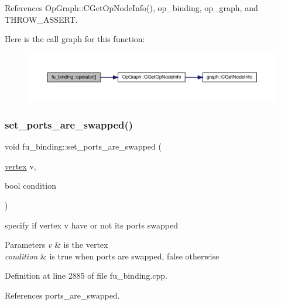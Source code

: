 References Op\+Graph\+::\+C\+Get\+Op\+Node\+Info(), op\+\_\+binding, op\+\_\+graph, and T\+H\+R\+O\+W\+\_\+\+A\+S\+S\+E\+RT.

Here is the call graph for this function\+:
\nopagebreak
\begin{figure}[H]
\begin{center}
\leavevmode
\includegraphics[width=350pt]{d8/d04/classfu__binding_a51f3555cae82ec4eabe7c2ad3d21475a_cgraph}
\end{center}
\end{figure}
\mbox{\label{classfu__binding_a04518ec079c3447b876a609b8d3ae288}} 
\subsubsection{\texorpdfstring{set\+\_\+ports\+\_\+are\+\_\+swapped()}{set\_ports\_are\_swapped()}}
{\footnotesize\ttfamily void fu\+\_\+binding\+::set\+\_\+ports\+\_\+are\+\_\+swapped (\begin{DoxyParamCaption}\item[{\hyperlink{graph_8hpp_abefdcf0544e601805af44eca032cca14}{vertex}}]{v,  }\item[{bool}]{condition }\end{DoxyParamCaption})}



specify if vertex v have or not its ports swapped 


\begin{DoxyParams}{Parameters}
{\em v} & is the vertex \\
\hline
{\em condition} & is true when ports are swapped, false otherwise \\
\hline
\end{DoxyParams}


Definition at line 2885 of file fu\+\_\+binding.\+cpp.



References ports\+\_\+are\+\_\+swapped.



